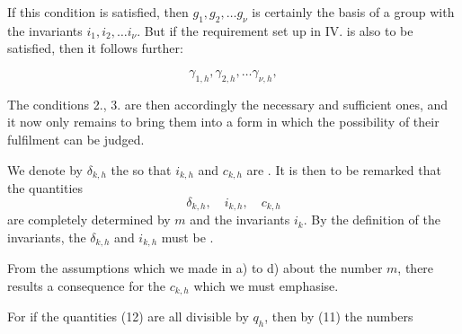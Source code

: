 If this condition is satisfied, then $g_1, g_2, \dots g_\nu$ is certainly the basis of a group with the invariants $i_1, i_2, \dots i_\nu$. But if the requirement set up in IV. is also to be satisfied, then it follows further:

\[
\gamma_{1,h}, \gamma_{2,h}, \dots \gamma_{\nu,h},
\]

The conditions 2., 3. are then accordingly the necessary and sufficient ones, and it now only remains to bring them into a form in which the possibility of their fulfilment can be judged.

We denote by $\delta_{k,h}$ the 
so that $i_{k,h}$ and $c_{k,h}$ are . It is then to be remarked that the quantities
\[
\delta_{k,h}, \quad i_{k,h}, \quad c_{k,h}
\]
are completely determined by $m$ and the invariants $i_k$. By the definition of the invariants, the $\delta_{k,h}$ and $i_{k,h}$ must be .

From the assumptions which we made in a) to d) about the number $m$, there results a consequence for the $c_{k,h}$ which we must emphasise.


For if the quantities (12) are all divisible by $q_h$, then by (11) the numbers
